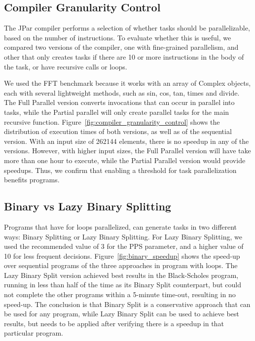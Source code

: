 \documentclass[smallextended]{svjour3}
\begin{document}
\subsection{Compiler Granularity Control}

The JPar compiler performs a selection of whether tasks should be parallelizable, based on the number of instructions. To evaluate whether this is useful, we compared two versions of the compiler, one with fine-grained parallelism, and other that only creates tasks if there are 10 or more instructions in the body of the task, or have recursive calls or loops.


We used the FFT benchmark because it works with an array of Complex objects, each with several lightweight methods, such as sin, cos, tan, times and divide. The Full Parallel version converts invocations that can occur in parallel into tasks, while the Partial parallel will only create parallel tasks for the main recursive function. Figure~\ref{fig:compiler_granularity_control} shows the distribution of execution times of both versions, as well as of the sequential version. With an input size of 262144 elements, there is no speedup in any of the versions. However, with higher input sizes, the Full Parallel version will have take more than one hour to execute, while the Partial Parallel version would provide speedups. Thus, we confirm that enabling a threshold for task parallelization benefits programs.


\subsection{Binary vs Lazy Binary Splitting}




Programs that have for loops parallelized, can generate tasks in two different ways: Binary Splitting or Lazy Binary Splitting. For Lazy Binary Splitting, we used the recommended value of 3 for the PPS parameter, and a higher value of 10 for less frequent decisions. Figure~\ref{fig:binary_speedup} shows the speed-up over sequential programs of the three approaches in program with loops. The Lazy Binary Split version achieved best results in the Black-Scholes program, running in less than half of the time as its Binary Split counterpart, but could not complete the other programs within a 5-minute time-out, resulting in no speed-up. The conclusion is that Binary Split is a conservative approach that can be used for any program, while Lazy Binary Split can be used to achieve best results, but needs to be applied after verifying there is a speedup in that particular program.
\end{document}
